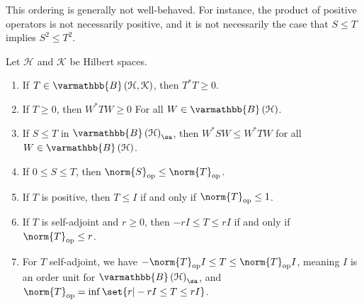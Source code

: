 \documentclass[10pt]{mypackage}
\renewcommand*{\mathbb}[1]{\varmathbb{#1}}
\newcommand{\B}{\mathbb{B}}
\begin{document}
\begin{remark}
  This ordering is generally not well-behaved. For instance, the product of positive operators is not necessarily positive, and it is not necessarily the case that $S\leq T$ implies $S^2 \leq T^2$.
\end{remark}
\begin{proposition}
  Let $\mathcal{H}$ and $\mathcal{K}$ be Hilbert spaces.
  \begin{enumerate}[(1)]
    \item If $T\in \B\left(\mathcal{H},\mathcal{K}\right)$, then $T^{\ast}T \geq 0$.
    \item If $T\geq 0$, then $W^{\ast}TW \geq 0$ For all $W\in \B\left(\mathcal{H}\right)$.
    \item If $S\leq T$ in $\B\left(\mathcal{H}\right)_{\sa}$, then $W^{\ast}SW \leq W^{\ast}TW$ for all $W\in \B\left(\mathcal{H}\right)$.
    \item If $0 \leq S \leq T$, then $\norm{S}_{\text{op}} \leq \norm{T}_{\text{op}}$.
    \item If $T$ is positive, then $T\leq I$ if and only if $\norm{T}_{\text{op}}\leq 1$.
    \item If $T$ is self-adjoint and $r\geq 0$, then $-rI \leq T \leq rI$ if and only if $\norm{T}_{\text{op}} \leq r$.
    \item For $T$ self-adjoint, we have $-\norm{T}_{\text{op}}I \leq T \leq \norm{T}_{\text{op}}I$, meaning $I$ is an order unit for $\B\left(\mathcal{H}\right)_{\sa}$, and $\norm{T}_{\text{op}} = \inf\set{r | -rI \leq T \leq rI}$.
  \end{enumerate}
\end{proposition}
\end{document}
